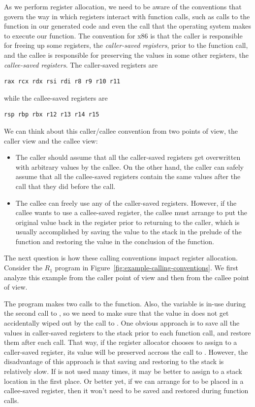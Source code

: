 \documentclass[11pt]{book}
\begin{document}
As we perform register allocation, we need to be aware of the
conventions that govern the way in which registers interact with
function calls, such as calls to the  function in our
generated code and even the call that the operating system makes to
execute our  function.  The convention for x86 is that the
caller is responsible for freeing up some registers, the
\emph{caller-saved registers}, prior to the function call, and the
callee is responsible for preserving the values in some other
registers, the \emph{callee-saved registers}.
The caller-saved registers are
\begin{lstlisting}
rax rcx rdx rsi rdi r8 r9 r10 r11
\end{lstlisting}
while the callee-saved registers are
\begin{lstlisting}
rsp rbp rbx r12 r13 r14 r15
\end{lstlisting}

We can think about this caller/callee convention from two points of
view, the caller view and the callee view:
\begin{itemize}
\item The caller should assume that all the caller-saved registers get
  overwritten with arbitrary values by the callee.  On the other hand,
  the caller can safely assume that all the callee-saved registers
  contain the same values after the call that they did before the
  call.
\item The callee can freely use any of the caller-saved registers.
  However, if the callee wants to use a callee-saved register, the
  callee must arrange to put the original value back in the register
  prior to returning to the caller, which is usually accomplished by
  saving the value to the stack in the prelude of the function and
  restoring the value in the conclusion of the function.
\end{itemize}

The next question is how these calling conventions impact register
allocation. Consider the $R_1$ program in
Figure~\ref{fig:example-calling-conventions}.  We first analyze this
example from the caller point of view and then from the callee point
of view.

The program makes two calls to the  function.  Also, the
variable  is in-use during the second call to , so
we need to make sure that the value in  does not get
accidentally wiped out by the call to .  One obvious
approach is to save all the values in caller-saved registers to the
stack prior to each function call, and restore them after each
call. That way, if the register allocator chooses to assign 
to a caller-saved register, its value will be preserved accross the
call to .  However, the disadvantage of this approach is
that saving and restoring to the stack is relatively slow. If 
is not used many times, it may be better to assign  to a stack
location in the first place. Or better yet, if we can arrange for
 to be placed in a callee-saved register, then it won't need
to be saved and restored during function calls.
\end{document}
